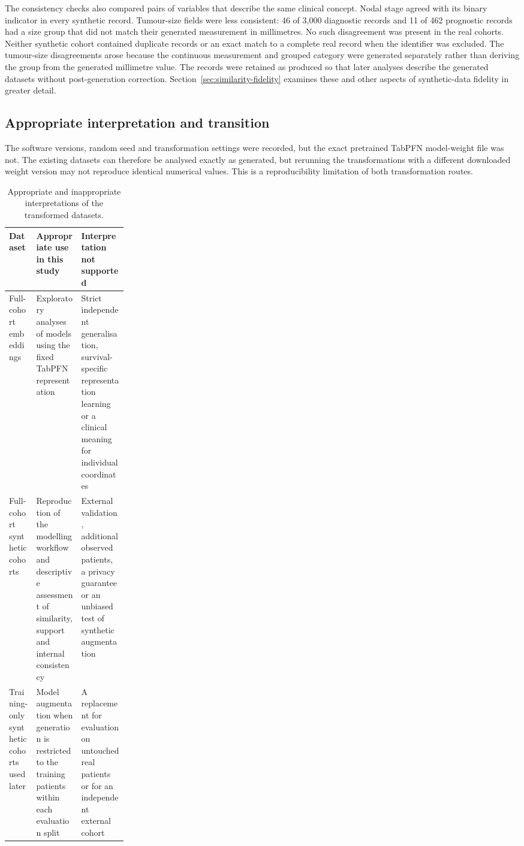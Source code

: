 The consistency checks also compared pairs of variables that describe the same
clinical concept. Nodal stage agreed with its binary indicator in every
synthetic record. Tumour-size fields were less consistent: 46 of 3,000 diagnostic
records and 11 of 462 prognostic records had a size group that did not match their
generated measurement in millimetres. No such disagreement was present in the
real cohorts. Neither synthetic cohort contained duplicate records or an exact
match to a complete real record when the identifier was excluded. The
tumour-size disagreements arose because the continuous measurement and grouped
category were generated separately rather than deriving the group from the
generated millimetre value. The records were retained as produced so that later
analyses describe the generated datasets without post-generation correction.
Section~\ref{sec:similarity-fidelity} examines these and other aspects of
synthetic-data fidelity in greater detail.
\FloatBarrier

\subsection{Appropriate interpretation and transition}
\label{sec:transforms:provenance}

The software versions, random seed and transformation settings were recorded,
but the exact pretrained TabPFN model-weight file was not. The existing datasets
can therefore be analysed exactly as generated, but rerunning the transformations
with a different downloaded weight version may not reproduce identical numerical
values. This is a reproducibility limitation of both transformation routes.

\begin{table}[htbp]
\centering\small
\caption{Appropriate and inappropriate interpretations of the transformed
datasets.}
\label{tab:transforms:use_boundary}
\begin{tabularx}{\linewidth}{@{}p{0.23\linewidth}YY@{}}
\toprule
Dataset & Appropriate use in this study & Interpretation not supported \\
\midrule
Full-cohort embeddings & Exploratory analyses of models using the fixed
TabPFN representation & Strict independent generalisation, survival-specific
representation learning or a clinical meaning for individual coordinates \\
Full-cohort synthetic cohorts & Reproduction of the modelling workflow and
descriptive assessment of similarity, support and internal consistency &
External validation, additional observed patients, a privacy guarantee or an
unbiased test of synthetic augmentation \\
Training-only synthetic cohorts used later & Model augmentation when generation
is restricted to the training patients within each evaluation split & A
replacement for evaluation on untouched real patients or for an independent
external cohort \\
\bottomrule
\end{tabularx}
\end{table}
\FloatBarrier

